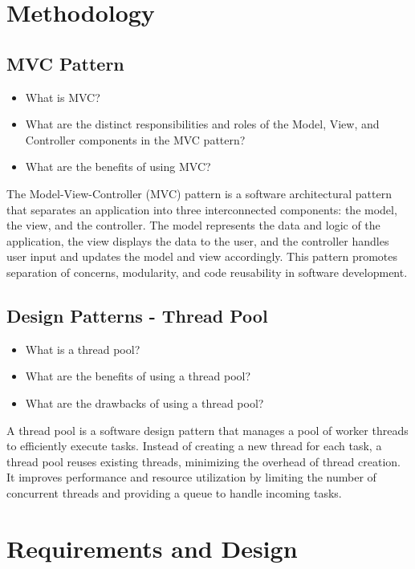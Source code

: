 \chapter{Methodology}

\section{MVC Pattern}
\begin{itemize}
	\item What is MVC?
	\item What are the distinct responsibilities and roles of the Model, View, and Controller components in the MVC pattern?
	\item What are the benefits of using MVC?
\end{itemize}


The Model-View-Controller (MVC) pattern is a software architectural pattern that separates an application into three interconnected components: the model, the view, and the controller. The model represents the data and logic of the application, the view displays the data to the user, and the controller handles user input and updates the model and view accordingly. This pattern promotes separation of concerns, modularity, and code reusability in software development. \cite{Verstehen19}

\section{Design Patterns - Thread Pool}
\begin{itemize}
	\item What is a thread pool?
	\item What are the benefits of using a thread pool?
	\item What are the drawbacks of using a thread pool?
\end{itemize}


A thread pool is a software design pattern that manages a pool of worker threads to efficiently execute tasks. Instead of creating a new thread for each task, a thread pool reuses existing threads, minimizing the overhead of thread creation. It improves performance and resource utilization by limiting the number of concurrent threads and providing a queue to handle incoming tasks.\cite{Brownlee22}

\chapter{Requirements and Design}
